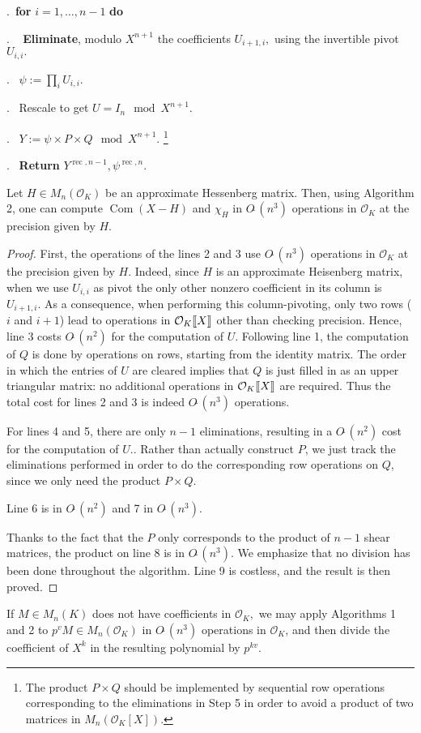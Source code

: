 \documentclass{sig-alternate-05-2015}
\DeclareMathOperator{\com}{Com}
\DeclareMathOperator{\rec}{rec}
\newcommand{\OK}{\mathcal{O}_K}
\newcommand{\llb}{[\mkern-2.5mu[}
\newcommand{\rrb}{]\mkern-2.5mu]}
\newcommand{\softO}{O\tilde{~}}
\begin{document}
.\    {\bf for} $i=1,\dots,n-1$ {\bf do} 

. \  \:  \textbf{Eliminate}, modulo $X^{n+1}$ the coefficients $U_{i+1,i},$
using the invertible pivot $U_{i,i}.$

. \ $\psi:=\prod_i U_{i,i}.$

. \ Rescale to get $U = I_n \mod X^{n+1}.$

. \ $Y:=\psi \times P \times Q   \mod X^{n+1}.$ \footnote{The product $P \times Q$
should be implemented by sequential row operations corresponding to the eliminations in Step 5
in order to avoid a product of two matrices in $M_n(\OK[X])$.}

. \ \textbf{Return} $Y^{\rec,n-1}, \psi^{\rec,n}.$

\vspace{-1ex}\noindent\hrulefill

\medskip

\begin{theo}
Let $H \in M_n(\OK)$ be an approximate Hessenberg matrix.
Then, using Algorithm 2, one can compute $\com (X -H)$
and $\chi_H$ in 
$\softO (n^3)$ operations in $\OK$ at the precision given by $H.$
\end{theo}
\begin{proof}
First, the operations of the lines 2 and 3 use $\softO (n^3)$ operations
in $\OK$ at the precision given by $H.$
Indeed, since $H$ is an approximate Heisenberg matrix, when we use $U_{i,i}$ as pivot
the only other nonzero coefficient in its column is $U_{i+1,i}$.
As a consequence, when performing this column-pivoting, only two rows ($i$ and
$i+1$) lead to operations in $\OK \llb X \rrb$ other than checking precision.
Hence, line 3 costs $\softO (n^2)$ for the computation of $U.$
Following line 1, the computation of $Q$ is done by operations on rows, starting from the identity matrix.
The order in which the entries of $U$ are cleared implies that $Q$ is just filled in as an upper triangular matrix:
no additional operations in $\OK\llb X\rrb$ are required. Thus the total cost
for lines 2 and 3 is indeed $\softO (n^3)$ operations.

For lines 4 and 5, there are only $n-1$ eliminations, resulting in a $\softO (n^2)$ cost
for the computation of $U.$. Rather than actually construct $P$, we just track the eliminations
performed in order to do the corresponding row operations on $Q$, since we only need the product $P \times Q$.

Line 6 is in $\softO (n^2)$ and 7 in $\softO (n^3).$

Thanks to the fact that the $P$ only corresponds to the product of $n-1$ 
shear matrices, the
product on line 8 is in $\softO (n^3).$
We emphasize that no division has been done throughout the algorithm.
Line 9 is costless, and the result is then proved.
\end{proof}
\begin{rem}
If $M \in M_n(K)$ does not have coefficients in $\OK,$
we may apply Algorithms 1 and 2 to $p^v M \in M_n(\OK)$
in $\softO (n^3)$ operations in $\OK$, and then divide
the coefficient of $X^k$ in the resulting polynomial by $p^{kv}$.
\end{rem}
\end{document}
